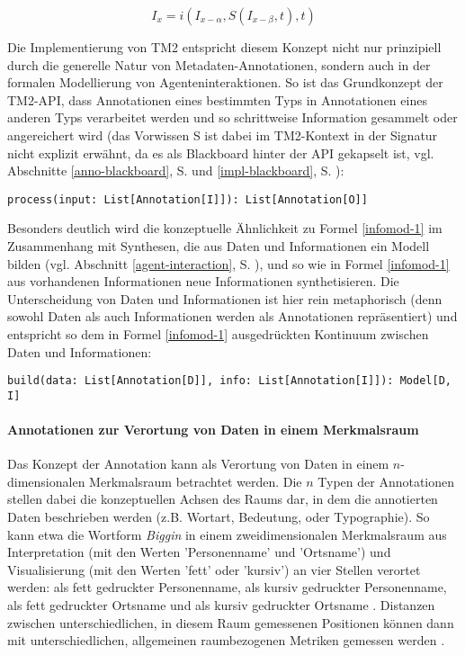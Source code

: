 \documentclass[abstracton, 12pt]{scrartcl}
\begin{document}
\begin{equation} 
I_x = i (I_{x-\alpha}, S(I_{x-\beta}, t), t) \label{infomod-1}
\end{equation}

Die Implementierung von TM2 entspricht diesem Konzept nicht nur prinzipiell durch die generelle Natur von Metadaten-Annotationen, sondern auch in der formalen Modellierung von Agenteninteraktionen. So ist das Grundkonzept der TM2-API, dass Annotationen eines bestimmten Typs in Annotationen eines anderen Typs verarbeitet werden und so schrittweise Information gesammelt oder angereichert wird (das Vorwissen S ist dabei im TM2-Kontext in der Signatur nicht explizit erwähnt, da es als Blackboard hinter der API gekapselt ist, vgl. Abschnitte \ref{anno-blackboard}, S. \pageref{anno-blackboard} und \ref{impl-blackboard}, S. \pageref{impl-blackboard}):

\begin{lstlisting}
process(input: List[Annotation[I]]): List[Annotation[O]]
\end{lstlisting}

Besonders deutlich wird die konzeptuelle Ähnlichkeit zu Formel \ref{infomod-1} im Zusammenhang mit Synthesen, die aus Daten und Informationen ein Modell bilden (vgl. Abschnitt \ref{agent-interaction}, S. \pageref{agent-interaction}), und so wie in Formel \ref{infomod-1} aus vorhandenen Informationen neue Informationen synthetisieren. Die Unterscheidung von Daten und Informationen ist hier rein metaphorisch (denn sowohl Daten als auch Informationen werden als Annotationen repräsentiert) und entspricht so dem in Formel \ref{infomod-1} ausgedrückten Kontinuum zwischen Daten und Informationen:

\begin{lstlisting}
build(data: List[Annotation[D]], info: List[Annotation[I]]): Model[D, I]
\end{lstlisting}

\paragraph{Annotationen zur Verortung von Daten in einem Merkmalsraum}

Das Konzept der Annotation kann als Verortung von Daten in einem $n$-dimensionalen Merkmalsraum betrachtet werden. Die $n$ Typen der Annotationen stellen dabei die konzeptuellen Achsen des Raums dar, in dem die annotierten Daten beschrieben werden (z.B. Wortart, Bedeutung, oder Typographie). So kann etwa die Wortform \emph{Biggin} in einem zweidimensionalen Merkmalsraum aus Interpretation (mit den Werten 'Personenname' und 'Ortsname') und Visualisierung (mit den Werten 'fett' oder 'kursiv') an vier Stellen verortet werden: als fett gedruckter Personenname, als kursiv gedruckter Personenname, als fett gedruckter Ortsname und als kursiv gedruckter Ortsname \citep[231]{Thaller2009b}. Dis\-tanz\-en zwischen unterschiedlichen, in diesem Raum gemessenen Positionen können dann mit unterschiedlichen, allgemeinen raumbezogenen Metriken gemessen werden \citep[235]{Thaller2009b}.
\end{document}
